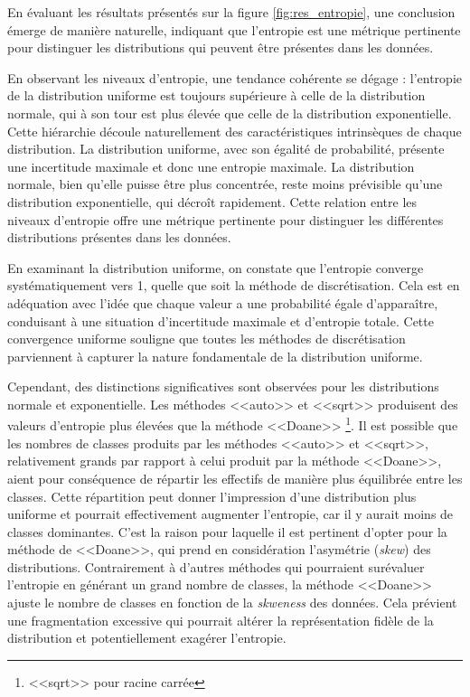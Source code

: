 En évaluant les résultats présentés sur la figure \ref{fig:res_entropie}, une conclusion émerge de manière naturelle, indiquant que l'entropie est une métrique pertinente pour distinguer les distributions qui peuvent être présentes dans les données. 

En observant les niveaux d'entropie, une tendance cohérente se dégage : l'entropie de la distribution uniforme est toujours supérieure à celle de la distribution normale, qui à son tour est plus élevée que celle de la distribution exponentielle. Cette hiérarchie découle naturellement des caractéristiques intrinsèques de chaque distribution. La distribution uniforme, avec son égalité de probabilité, présente une incertitude maximale et donc une entropie maximale. La distribution normale, bien qu'elle puisse être plus concentrée, reste moins prévisible qu'une distribution exponentielle, qui décroît rapidement. Cette relation entre les niveaux d'entropie offre une métrique pertinente pour distinguer les différentes distributions présentes dans les données.

En examinant la distribution uniforme, on constate que l'entropie converge systématiquement vers 1, quelle que soit la méthode de discrétisation. Cela est en adéquation avec l'idée que chaque valeur a une probabilité égale d'apparaître, conduisant à une situation d'incertitude maximale et d'entropie totale. Cette convergence uniforme souligne que toutes les méthodes de discrétisation parviennent à capturer la nature fondamentale de la distribution uniforme.

Cependant, des distinctions significatives sont observées pour les distributions normale et exponentielle. Les méthodes <<auto>> et <<sqrt>> produisent des valeurs d'entropie plus élevées que la méthode <<Doane>> \footnote{<<sqrt>> pour racine carrée}. Il est possible que les nombres de classes produits par les méthodes <<auto>> et <<sqrt>>, relativement grands par rapport à celui produit par la méthode <<Doane>>, aient pour conséquence de répartir les effectifs de manière plus équilibrée entre les classes. Cette répartition peut donner l'impression d'une distribution plus uniforme et pourrait effectivement augmenter l'entropie, car il y aurait moins de classes dominantes. C'est la raison pour laquelle il est pertinent d'opter pour la méthode de <<Doane>>, qui prend en considération l'asymétrie (\textit{skew}) des distributions. Contrairement à d'autres méthodes qui pourraient surévaluer l'entropie en générant un grand nombre de classes, la méthode <<Doane>> ajuste le nombre de classes en fonction de la \textit{skweness} des données. Cela prévient une fragmentation excessive qui pourrait altérer la représentation fidèle de la distribution et potentiellement exagérer l'entropie.


